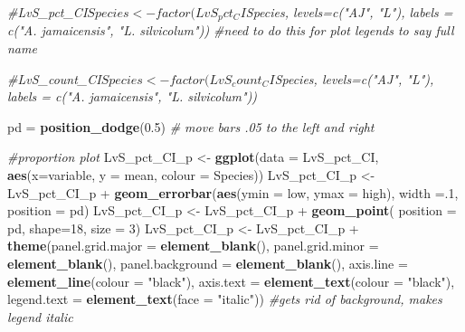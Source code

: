 \documentclass[]{article}
\newenvironment{Shaded}{\begin{snugshade}}{\end{snugshade}}
\newcommand{\KeywordTok}[1]{\textcolor[rgb]{0.13,0.29,0.53}{\textbf{{#1}}}}
\newcommand{\DataTypeTok}[1]{\textcolor[rgb]{0.13,0.29,0.53}{{#1}}}
\newcommand{\DecValTok}[1]{\textcolor[rgb]{0.00,0.00,0.81}{{#1}}}
\newcommand{\FloatTok}[1]{\textcolor[rgb]{0.00,0.00,0.81}{{#1}}}
\newcommand{\StringTok}[1]{\textcolor[rgb]{0.31,0.60,0.02}{{#1}}}
\newcommand{\CommentTok}[1]{\textcolor[rgb]{0.56,0.35,0.01}{\textit{{#1}}}}
\newcommand{\NormalTok}[1]{{#1}}
\begin{document}
\begin{Shaded}
\begin{Highlighting}[]
\CommentTok{#LvS_pct_CI$Species <- factor(LvS_pct_CI$Species, levels=c("AJ", "L"), labels = c("A. jamaicensis", "L. silvicolum")) #need to do this for plot legends to say full name}

\CommentTok{#LvS_count_CI$Species <- factor(LvS_count_CI$Species, levels=c("AJ", "L"), labels = c("A. jamaicensis", "L. silvicolum"))}


\NormalTok{pd =}\StringTok{ }\KeywordTok{position_dodge}\NormalTok{(}\FloatTok{0.5}\NormalTok{) }\CommentTok{# move bars .05 to the left and right}

\CommentTok{#proportion plot}
\NormalTok{LvS_pct_CI_p <-}\StringTok{ }\KeywordTok{ggplot}\NormalTok{(}\DataTypeTok{data =} \NormalTok{LvS_pct_CI, }\KeywordTok{aes}\NormalTok{(}\DataTypeTok{x=}\NormalTok{variable, }\DataTypeTok{y =} \NormalTok{mean, }\DataTypeTok{colour =} \NormalTok{Species))}
\NormalTok{LvS_pct_CI_p <-}\StringTok{ }\NormalTok{LvS_pct_CI_p +}\StringTok{ }\KeywordTok{geom_errorbar}\NormalTok{(}\KeywordTok{aes}\NormalTok{(}\DataTypeTok{ymin =} \NormalTok{low, }\DataTypeTok{ymax =} \NormalTok{high), }\DataTypeTok{width =}\NormalTok{.}\DecValTok{1}\NormalTok{, }\DataTypeTok{position =} \NormalTok{pd)}
\NormalTok{LvS_pct_CI_p <-}\StringTok{ }\NormalTok{LvS_pct_CI_p +}\StringTok{ }\KeywordTok{geom_point}\NormalTok{( }\DataTypeTok{position =} \NormalTok{pd, }\DataTypeTok{shape=}\DecValTok{18}\NormalTok{, }\DataTypeTok{size =} \DecValTok{3}\NormalTok{)}
\NormalTok{LvS_pct_CI_p <-}\StringTok{ }\NormalTok{LvS_pct_CI_p +}\StringTok{ }\KeywordTok{theme}\NormalTok{(}\DataTypeTok{panel.grid.major =} \KeywordTok{element_blank}\NormalTok{(), }\DataTypeTok{panel.grid.minor =} \KeywordTok{element_blank}\NormalTok{(),}
\DataTypeTok{panel.background =} \KeywordTok{element_blank}\NormalTok{(), }\DataTypeTok{axis.line =} \KeywordTok{element_line}\NormalTok{(}\DataTypeTok{colour =} \StringTok{"black"}\NormalTok{), }\DataTypeTok{axis.text =} \KeywordTok{element_text}\NormalTok{(}\DataTypeTok{colour =} \StringTok{"black"}\NormalTok{), }\DataTypeTok{legend.text =} \KeywordTok{element_text}\NormalTok{(}\DataTypeTok{face =} \StringTok{"italic"}\NormalTok{))  }\CommentTok{#gets rid of background, makes legend italic}


\end{Highlighting}
\end{Shaded}
\end{document}
